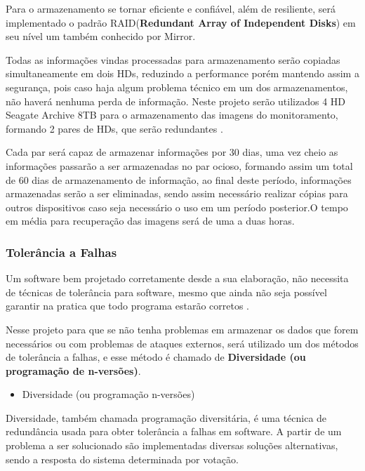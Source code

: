 Para o armazenamento se tornar eficiente e confiável, além de resiliente, será implementado o
padrão RAID(\textbf{Redundant Array of Independent Disks}) em seu nível um também conhecido por
Mirror.

Todas as informações vindas processadas para armazenamento serão copiadas simultaneamente em dois HDs, reduzindo a performance porém mantendo assim a segurança, pois caso haja algum problema técnico em um dos armazenamentos, não haverá nenhuma perda de informação. Neste projeto serão utilizados 4 HD Seagate Archive 8TB para o armazenamento das imagens do monitoramento, formando 2 pares de HDs, que serão redundantes \cite{raid}.

Cada par será capaz de armazenar informações por 30 dias, uma vez cheio as informações passarão a ser armazenadas no par ocioso, formando assim um total de 60 dias de armazenamento de informação, ao final deste período, informações armazenadas serão a ser eliminadas, sendo assim necessário realizar cópias para outros dispositivos caso seja necessário o uso em um período posterior.O tempo em média para recuperação das imagens será de uma a duas horas.

\subsubsection{Tolerância a Falhas}

Um software bem projetado corretamente desde a sua elaboração, não necessita de técnicas de tolerância para software, mesmo que ainda não seja possível garantir na pratica que todo programa estarão corretos \cite{webertolerancia}.

Nesse projeto para que se não tenha problemas em armazenar os dados que forem necessários ou com problemas de ataques externos, será utilizado um dos métodos de tolerância a falhas, e esse método é chamado de \textbf{Diversidade (ou programação de n-versões)}.

\begin{itemize}
	\item Diversidade (ou programação n-versões)
\end{itemize}
\par


Diversidade, também chamada programação diversitária, é uma técnica de redundância usada para obter tolerância a falhas em software. A partir de um problema a ser solucionado são implementadas diversas soluções alternativas, sendo a resposta do sistema determinada por votação.

